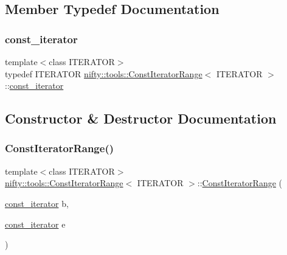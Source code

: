 \subsection{Member Typedef Documentation}
\mbox{\label{classnifty_1_1tools_1_1ConstIteratorRange_afb02141878a935f32f828810a2be648b}} 
\subsubsection{\texorpdfstring{const\+\_\+iterator}{const\_iterator}}
{\footnotesize\ttfamily template$<$class I\+T\+E\+R\+A\+T\+OR$>$ \\
typedef I\+T\+E\+R\+A\+T\+OR \hyperlink{classnifty_1_1tools_1_1ConstIteratorRange}{nifty\+::tools\+::\+Const\+Iterator\+Range}$<$ I\+T\+E\+R\+A\+T\+OR $>$\+::\hyperlink{classnifty_1_1tools_1_1ConstIteratorRange_afb02141878a935f32f828810a2be648b}{const\+\_\+iterator}}



\subsection{Constructor \& Destructor Documentation}
\mbox{\label{classnifty_1_1tools_1_1ConstIteratorRange_a004be230f5b9612f6890e4cceed0ce92}} 
\subsubsection{\texorpdfstring{Const\+Iterator\+Range()}{ConstIteratorRange()}}
{\footnotesize\ttfamily template$<$class I\+T\+E\+R\+A\+T\+OR$>$ \\
\hyperlink{classnifty_1_1tools_1_1ConstIteratorRange}{nifty\+::tools\+::\+Const\+Iterator\+Range}$<$ I\+T\+E\+R\+A\+T\+OR $>$\+::\hyperlink{classnifty_1_1tools_1_1ConstIteratorRange}{Const\+Iterator\+Range} (\begin{DoxyParamCaption}\item[{\hyperlink{classnifty_1_1tools_1_1ConstIteratorRange_afb02141878a935f32f828810a2be648b}{const\+\_\+iterator}}]{b,  }\item[{\hyperlink{classnifty_1_1tools_1_1ConstIteratorRange_afb02141878a935f32f828810a2be648b}{const\+\_\+iterator}}]{e }\end{DoxyParamCaption})\hspace{0.3cm}{\ttfamily [inline]}}




